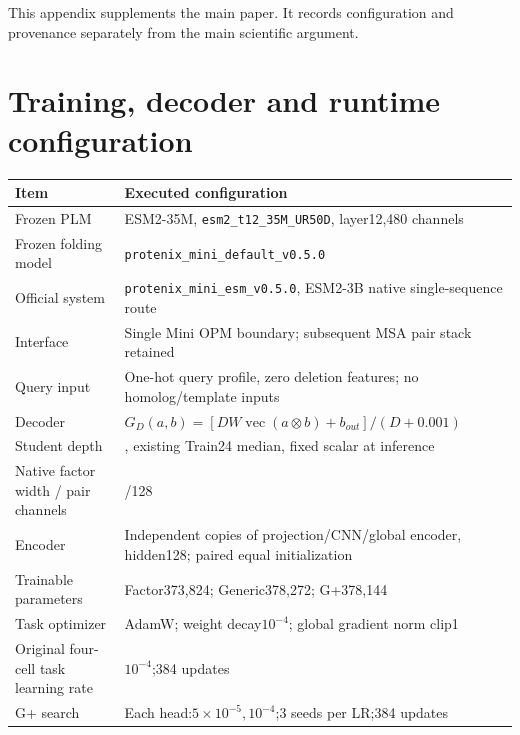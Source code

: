 This appendix supplements the main paper. It records
configuration and provenance separately from the main scientific argument.

\section{Training, decoder and runtime configuration}\label{training-decoder-and-runtime-configuration}

\begin{longtable}[]{@{}
  >{\raggedright\arraybackslash}p{}
  >{\raggedright\arraybackslash}p{}@{}}
\toprule\noalign{}
\begin{minipage}[b]{\linewidth}\raggedright
Item
\end{minipage} & \begin{minipage}[b]{\linewidth}\raggedright
Executed configuration
\end{minipage} \\
\midrule\noalign{}
\endhead
\bottomrule\noalign{}
\endlastfoot
Frozen PLM & ESM2-35M, \nolinkurl{esm2_t12_35M_UR50D}, layer12,480 channels \\
Frozen folding model & \nolinkurl{protenix_mini_default_v0.5.0} \\
Official system & \nolinkurl{protenix_mini_esm_v0.5.0}, ESM2-3B native single-sequence route \\
Interface & Single Mini OPM boundary; subsequent MSA pair stack retained \\
Query input & One-hot query profile, zero deletion features; no homolog/template inputs \\
Decoder & \(G_D(a,b)=[D W\operatorname{vec}(a\otimes b)+b_{out}]/(D+0.001)\) \\
Student depth & 508.5, existing Train24 median, fixed scalar at inference \\
Native factor width / pair channels & 32 /128 \\
Encoder & Independent copies of projection/CNN/global encoder, hidden128; paired equal initialization \\
Trainable parameters & Factor373,824; Generic378,272; G+378,144 \\
Task optimizer & AdamW; weight decay\(10^{-4}\); global gradient norm clip1 \\
Original four-cell task learning rate & \(10^{-4}\);384 updates \\
G+ search & Each head:\(5\times10^{-5},10^{-4}\);3 seeds per LR;384 updates \\

\end{longtable}
